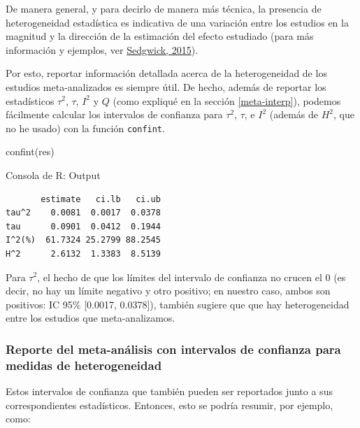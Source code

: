 \documentclass[
  bookmarksnumbered]{article}
\newenvironment{Shaded}{\begin{snugshade}}{\end{snugshade}}
\newcommand{\FunctionTok}[1]{\textcolor[rgb]{0.39,0.29,0.61}{#1}}
\newcommand{\NormalTok}[1]{\textcolor[rgb]{0.12,0.11,0.11}{#1}}
\begin{document}
De manera general, y para decirlo de manera más técnica, la presencia de heterogeneidad estadística es indicativa de una variación entre los estudios en la magnitud y la dirección de la estimación del efecto estudiado (para más información y ejemplos, ver \protect\hyperlink{ref-sedgwickMetaanalysesWhatHeterogeneity2015}{Sedgwick, 2015}).

Por esto, reportar información detallada acerca de la heterogeneidad de los estudios meta-analizados es siempre útil. De hecho, además de reportar los estadísticos \(\tau^2\), \(\tau\), \(I^2\) y \(Q\) (como expliqué en la sección \ref{meta-interp}), podemos fácilmente calcular los intervalos de confianza para \(\tau^2\), \(\tau\), e \(I^2\) (además de \(H^2\), que no he usado) con la función \texttt{confint}.

\begin{Shaded}
\begin{Highlighting}[]
\FunctionTok{confint}\NormalTok{(res)}
\end{Highlighting}
\end{Shaded}

\begin{ROut}{Consola de R: Output~\thetcbcounter}
                \begin{footnotesize}
                \begin{verbatim} 
       estimate   ci.lb   ci.ub 
tau^2    0.0081  0.0017  0.0378 
tau      0.0901  0.0412  0.1944 
I^2(%)  61.7324 25.2799 88.2545 
H^2      2.6132  1.3383  8.5139 
 \end{verbatim}
                \end{footnotesize}
                \end{ROut}

Para \(\tau^2\), el hecho de que los límites del intervalo de confianza no crucen el 0 (es decir, no hay un límite negativo y otro positivo; en nuestro caso, ambos son positivos: IC 95\% {[}0.0017, 0.0378{]}), también sugiere que que hay heterogeneidad entre los estudios que meta-analizamos.

\hypertarget{reporte2}{%
\subsubsection{Reporte del meta-análisis con intervalos de confianza para medidas de heterogeneidad}\label{reporte2}}

Estos intervalos de confianza que también pueden ser reportados junto a sus correspondientes estadísticos. Entonces, esto se podría resumir, por ejemplo, como:
\end{document}
